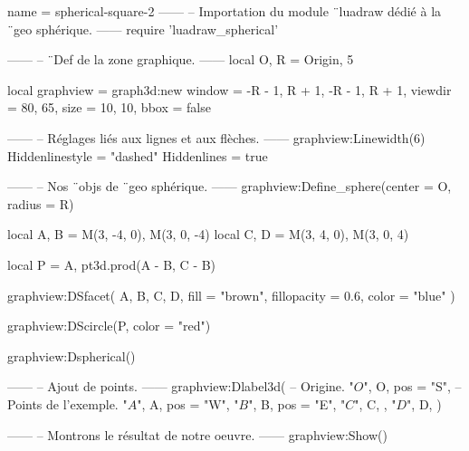 \documentclass[border = 3pt]{standalone}
\begin{document}
\begin{luadraw*}{name = spherical-square-2}
------
-- Importation du module ¨luadraw dédié à la ¨geo sphérique.
------
require 'luadraw_spherical'

------
-- ¨Def de la zone graphique.
------
local O, R = Origin, 5

local graphview = graph3d:new{
  window  = {-R - 1, R + 1, -R - 1, R + 1},
  viewdir = {80, 65},
  size    = {10, 10},
  bbox    = false
}

------
-- Réglages liés aux lignes et aux flèches.
------
graphview:Linewidth(6)
Hiddenlinestyle = "dashed"
Hiddenlines     = true

------
-- Nos ¨objs de ¨geo sphérique.
------
graphview:Define_sphere({center = O, radius = R})

local A, B = M(3, -4, 0), M(3, 0, -4)
local C, D = M(3, 4, 0), M(3, 0, 4)

local P = {A, pt3d.prod(A - B, C - B)}

graphview:DSfacet(
  {A, B, C, D},
  {fill = "brown", fillopacity = 0.6, color = "blue"}
)

graphview:DScircle(P, {color = "red"})

graphview:Dspherical()

------
-- Ajout de points.
------
graphview:Dlabel3d(
-- Origine.
  "$O$", O, {pos = "S"},
-- Points de l'exemple.
  "$A$", A, {pos = "W"},
  "$B$", B, {pos = "E"},
  "$C$", C, {},
  "$D$", D, {}
)

------
-- Montrons le résultat de notre oeuvre.
------
graphview:Show()
\end{luadraw*}
\end{document}

